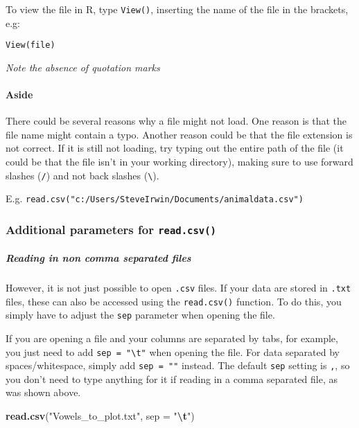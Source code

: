 \documentclass[
]{article}
\newenvironment{Shaded}{\begin{snugshade}}{\end{snugshade}}
\newcommand{\AttributeTok}[1]{\textcolor[rgb]{0.13,0.29,0.53}{#1}}
\newcommand{\FunctionTok}[1]{\textcolor[rgb]{0.13,0.29,0.53}{\textbf{#1}}}
\newcommand{\NormalTok}[1]{#1}
\newcommand{\SpecialCharTok}[1]{\textcolor[rgb]{0.81,0.36,0.00}{\textbf{#1}}}
\newcommand{\StringTok}[1]{\textcolor[rgb]{0.31,0.60,0.02}{#1}}
\begin{document}
To view the file in R, type \texttt{View()}, inserting the name of the
file in the brackets, e.g:

\texttt{View(file)}

\emph{Note the absence of quotation marks}

\n

\hypertarget{aside}{%
\paragraph{Aside}\label{aside}}

There could be several reasons why a file might not load. One reason is
that the file name might contain a typo. Another reason could be that
the file extension is not correct. If it is still not loading, try
typing out the entire path of the file (it could be that the file isn't
in your working directory), making sure to use forward slashes
(\texttt{/}) and not back slashes (\texttt{\textbackslash{}}).

E.g. \texttt{read.csv("c:/Users/SteveIrwin/Documents/animaldata.csv")}

\hypertarget{additional-parameters-for-read.csv}{%
\subsubsection{\texorpdfstring{Additional parameters for
\texttt{read.csv()}}{Additional parameters for read.csv()}}\label{additional-parameters-for-read.csv}}

\hypertarget{reading-in-non-comma-separated-files}{%
\subparagraph{Reading in non comma separated
files}\label{reading-in-non-comma-separated-files}}

However, it is not just possible to open \texttt{.csv} files. If your
data are stored in \texttt{.txt} files, these can also be accessed using
the \texttt{read.csv()} function. To do this, you simply have to adjust
the \texttt{sep} parameter when opening the file.

If you are opening a file and your columns are separated by tabs, for
example, you just need to add \texttt{sep\ =\ "\textbackslash{}t"} when
opening the file. For data separated by spaces/whitespace, simply add
\texttt{sep\ =\ ""} instead. The default \texttt{sep} setting is
\texttt{,}, so you don't need to type anything for it if reading in a
comma separated file, as was shown above.

\begin{Shaded}
\begin{Highlighting}[]
\FunctionTok{read.csv}\NormalTok{(}\StringTok{"Vowels\_to\_plot.txt"}\NormalTok{, }\AttributeTok{sep =} \StringTok{"}\SpecialCharTok{\textbackslash{}t}\StringTok{"}\NormalTok{)}
\end{Highlighting}
\end{Shaded}
\end{document}
